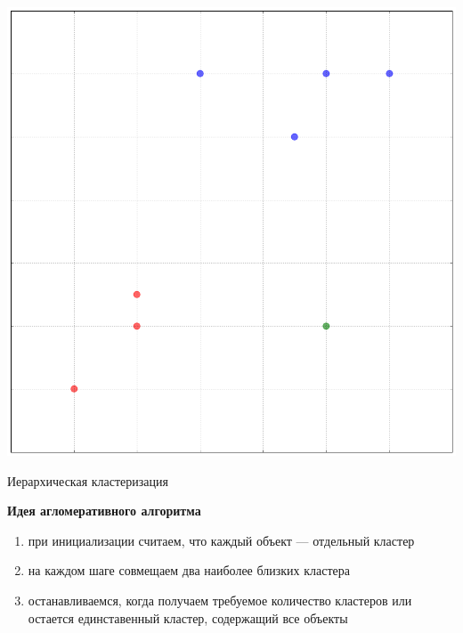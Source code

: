 \documentclass[aspectratio=169]{beamer}
\begin{document}
\begin{frame}

\begin{center}
\includegraphics[height=0.9\textheight]{images/toy.png}
\end{center}

\end{frame}

\begin{frame}{Иерархическая кластеризация}

{\bf Идея агломеративного алгоритма}
\begin{enumerate}
\item при инициализации считаем, что каждый объект --- отдельный кластер
\item на каждом шаге совмещаем два наиболее близких кластера
\item останавливаемся, когда получаем требуемое количество кластеров или остается единставенный кластер, содержащий все объекты
\end{enumerate}

\end{frame}
\end{document}
